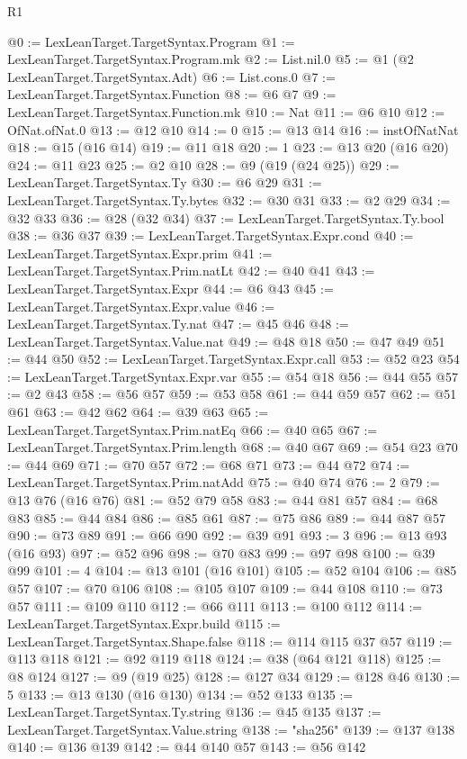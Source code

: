 \begin{lexlean}{R1}
\begin{coremodule}
@0 := LexLeanTarget.TargetSyntax.Program
@1 := LexLeanTarget.TargetSyntax.Program.mk
@2 := List.nil.{0}
@5 := @1 (@2 LexLeanTarget.TargetSyntax.Adt)
@6 := List.cons.{0}
@7 := LexLeanTarget.TargetSyntax.Function
@8 := @6 @7
@9 := LexLeanTarget.TargetSyntax.Function.mk
@10 := Nat
@11 := @6 @10
@12 := OfNat.ofNat.{0}
@13 := @12 @10
@14 := 0
@15 := @13 @14
@16 := instOfNatNat
@18 := @15 (@16 @14)
@19 := @11 @18
@20 := 1
@23 := @13 @20 (@16 @20)
@24 := @11 @23
@25 := @2 @10
@28 := @9 (@19 (@24 @25))
@29 := LexLeanTarget.TargetSyntax.Ty
@30 := @6 @29
@31 := LexLeanTarget.TargetSyntax.Ty.bytes
@32 := @30 @31
@33 := @2 @29
@34 := @32 @33
@36 := @28 (@32 @34)
@37 := LexLeanTarget.TargetSyntax.Ty.bool
@38 := @36 @37
@39 := LexLeanTarget.TargetSyntax.Expr.cond
@40 := LexLeanTarget.TargetSyntax.Expr.prim
@41 := LexLeanTarget.TargetSyntax.Prim.natLt
@42 := @40 @41
@43 := LexLeanTarget.TargetSyntax.Expr
@44 := @6 @43
@45 := LexLeanTarget.TargetSyntax.Expr.value
@46 := LexLeanTarget.TargetSyntax.Ty.nat
@47 := @45 @46
@48 := LexLeanTarget.TargetSyntax.Value.nat
@49 := @48 @18
@50 := @47 @49
@51 := @44 @50
@52 := LexLeanTarget.TargetSyntax.Expr.call
@53 := @52 @23
@54 := LexLeanTarget.TargetSyntax.Expr.var
@55 := @54 @18
@56 := @44 @55
@57 := @2 @43
@58 := @56 @57
@59 := @53 @58
@61 := @44 @59 @57
@62 := @51 @61
@63 := @42 @62
@64 := @39 @63
@65 := LexLeanTarget.TargetSyntax.Prim.natEq
@66 := @40 @65
@67 := LexLeanTarget.TargetSyntax.Prim.length
@68 := @40 @67
@69 := @54 @23
@70 := @44 @69
@71 := @70 @57
@72 := @68 @71
@73 := @44 @72
@74 := LexLeanTarget.TargetSyntax.Prim.natAdd
@75 := @40 @74
@76 := 2
@79 := @13 @76 (@16 @76)
@81 := @52 @79 @58
@83 := @44 @81 @57
@84 := @68 @83
@85 := @44 @84
@86 := @85 @61
@87 := @75 @86
@89 := @44 @87 @57
@90 := @73 @89
@91 := @66 @90
@92 := @39 @91
@93 := 3
@96 := @13 @93 (@16 @93)
@97 := @52 @96
@98 := @70 @83
@99 := @97 @98
@100 := @39 @99
@101 := 4
@104 := @13 @101 (@16 @101)
@105 := @52 @104
@106 := @85 @57
@107 := @70 @106
@108 := @105 @107
@109 := @44 @108
@110 := @73 @57
@111 := @109 @110
@112 := @66 @111
@113 := @100 @112
@114 := LexLeanTarget.TargetSyntax.Expr.build
@115 := LexLeanTarget.TargetSyntax.Shape.false
@118 := @114 @115 @37 @57
@119 := @113 @118
@121 := @92 @119 @118
@124 := @38 (@64 @121 @118)
@125 := @8 @124
@127 := @9 (@19 @25)
@128 := @127 @34
@129 := @128 @46
@130 := 5
@133 := @13 @130 (@16 @130)
@134 := @52 @133
@135 := LexLeanTarget.TargetSyntax.Ty.string
@136 := @45 @135
@137 := LexLeanTarget.TargetSyntax.Value.string
@138 := "sha256"
@139 := @137 @138
@140 := @136 @139
@142 := @44 @140 @57
@143 := @56 @142

\end{coremodule}
\end{lexlean}

